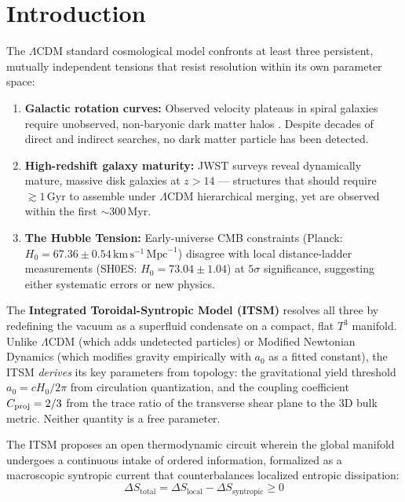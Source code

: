 \documentclass[aps,prd,10pt,twocolumn,superscriptaddress,nofootinbib,floatfix]{revtex4-2}
\begin{document}
\maketitle

\section{\label{sec:intro}Introduction}

The $\Lambda$CDM standard cosmological model confronts at least three persistent, mutually independent tensions that resist resolution within its own parameter space:
\begin{enumerate}
    \item \textbf{Galactic rotation curves:} Observed velocity plateaus in spiral galaxies require unobserved, non-baryonic dark matter halos \cite{rubin}. Despite decades of direct and indirect searches, no dark matter particle has been detected.
    \item \textbf{High-redshift galaxy maturity:} JWST surveys reveal dynamically mature, massive disk galaxies at $z > 14$ \cite{jwst_labbe, jwst_curtis_lake, jwst_carniani} --- structures that should require $\gtrsim 1\,\text{Gyr}$ to assemble under $\Lambda$CDM hierarchical merging, yet are observed within the first $\sim 300\,\text{Myr}$.
    \item \textbf{The Hubble Tension:} Early-universe CMB constraints (Planck: $H_0 = 67.36 \pm 0.54\,\text{km}\,\text{s}^{-1}\,\text{Mpc}^{-1}$) \cite{planck} disagree with local distance-ladder measurements (SH0ES: $H_0 = 73.04 \pm 1.04$) \cite{riess2022} at $5\sigma$ significance, suggesting either systematic errors or new physics.
\end{enumerate}

The \textbf{Integrated Toroidal-Syntropic Model (ITSM)} resolves all three by redefining the vacuum as a superfluid condensate on a compact, flat $T^3$ manifold. Unlike $\Lambda$CDM (which adds undetected particles) or Modified Newtonian Dynamics \cite{mond} (which modifies gravity empirically with $a_0$ as a fitted constant), the ITSM \emph{derives} its key parameters from topology: the gravitational yield threshold $a_0 = cH_0/2\pi$ from circulation quantization, and the coupling coefficient $C_{\rm proj} = 2/3$ from the trace ratio of the transverse shear plane to the 3D bulk metric. Neither quantity is a free parameter.

The ITSM proposes an open thermodynamic circuit wherein the global manifold undergoes a continuous intake of ordered information, formalized as a macroscopic syntropic current that counterbalances localized entropic dissipation:
\begin{equation}
\Delta S_{\text{total}} = \Delta S_{\text{local}} - \Delta S_{\text{syntropic}} \ge 0
\end{equation}
\end{document}
